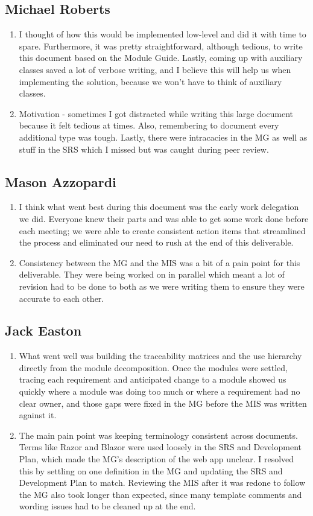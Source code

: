 \documentclass[12pt, titlepage]{article}
\begin{document}
\subsection{Michael Roberts}
\begin{enumerate}
  \item I thought of how this would be implemented low-level and did it with time to spare. Furthermore, it was pretty straightforward, although tedious, to write this document based on the Module Guide. Lastly, coming up with auxiliary classes saved a lot of verbose writing, and I believe this will help us when implementing the solution, because we won't have to think of auxiliary classes.
  \item Motivation - sometimes I got distracted while writing this large document because it felt tedious at times. Also, remembering to document every additional type was tough. Lastly, there were intracacies in the MG as well as stuff in the SRS which I missed but was caught during peer review.
\end{enumerate}

\subsection{Mason Azzopardi}
\begin{enumerate}
  \item I think what went best during this document was the early work delegation we did. Everyone knew their parts and was able to get some work done before each meeting; we were able to create consistent action items that streamlined the process and eliminated our need to rush at the end of this deliverable.
  \item Consistency between the MG and the MIS was a bit of a pain point for this deliverable. They were being worked on in parallel which meant a lot of revision had to be done to both as we were writing them to ensure they were accurate to each other.
\end{enumerate}

\subsection{Jack Easton}
\begin{enumerate}
  \item What went well was building the traceability matrices and the use hierarchy directly from the module decomposition. Once the modules were settled, tracing each requirement and anticipated change to a module showed us quickly where a module was doing too much or where a requirement had no clear owner, and those gaps were fixed in the MG before the MIS was written against it.
  \item The main pain point was keeping terminology consistent across documents. Terms like Razor and Blazor were used loosely in the SRS and Development Plan, which made the MG's description of the web app unclear. I resolved this by settling on one definition in the MG and updating the SRS and Development Plan to match. Reviewing the MIS after it was redone to follow the MG also took longer than expected, since many template comments and wording issues had to be cleaned up at the end.
\end{enumerate}
\end{document}
